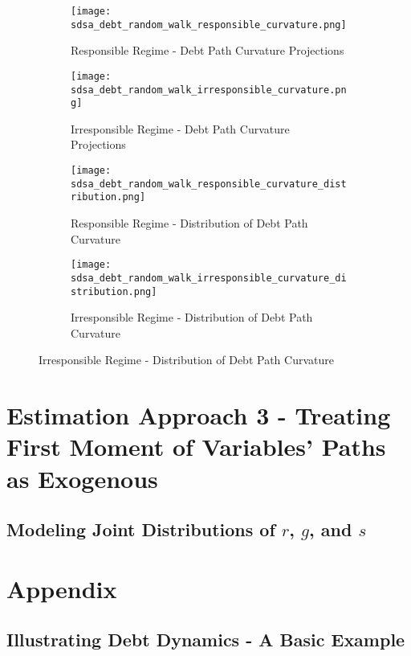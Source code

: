\documentclass{article}
\begin{document}
\begin{figure}[hbpt!]
\centering
\begin{subfigure}[b]{0.45\textwidth}
    \texttt{[image: sdsa\_debt\_random\_walk\_responsible\_curvature.png]}
    \caption{Responsible Regime - Debt Path Curvature Projections}
\end{subfigure}
\hfill
\begin{subfigure}[b]{0.45\textwidth}
    \texttt{[image: sdsa\_debt\_random\_walk\_irresponsible\_curvature.png]}
    \caption{Irresponsible Regime - Debt Path Curvature Projections}
\end{subfigure}

\centering
\begin{subfigure}[b]{0.45\textwidth}
    \texttt{[image: sdsa\_debt\_random\_walk\_responsible\_curvature\_distribution.png]}
    \caption{Responsible Regime - Distribution of Debt Path Curvature}
\end{subfigure}
\hfill
\begin{subfigure}[b]{0.45\textwidth}
    \texttt{[image: sdsa\_debt\_random\_walk\_irresponsible\_curvature\_distribution.png]}
    \caption{Irresponsible Regime - Distribution of Debt Path Curvature}
\end{subfigure}
\label{fig:debt_paths_all}
\end{figure}

\clearpage

\section{Estimation Approach 3 - Treating First Moment of Variables' Paths as Exogenous}

\subsection{Modeling Joint Distributions of $r$, $g$, and $s$}

\clearpage

\section{Appendix}

\subsection{Illustrating Debt Dynamics - A Basic Example}
\label{sec:appendix1}
\end{document}
